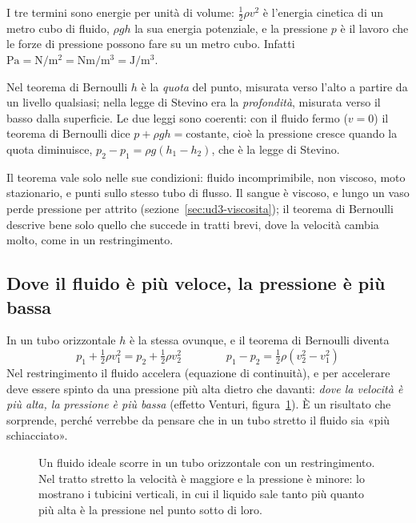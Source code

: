 I tre termini sono energie per unità di volume: $\frac{1}{2}\rho v^2$ è l'energia cinetica di un metro cubo di fluido, $\rho g h$ la sua energia potenziale, e la pressione $p$ è il lavoro che le forze di pressione possono fare su un metro cubo. Infatti $\si{\pascal} = \si{\newton\per\metre\squared} = \si{\newton\metre\per\metre\cubed} = \si{\joule\per\metre\cubed}$.

\begin{attenzione}
Nel teorema di Bernoulli $h$ è la \emph{quota} del punto, misurata verso l'alto a partire da un livello qualsiasi; nella legge di Stevino era la \emph{profondità}, misurata verso il basso dalla superficie. Le due leggi sono coerenti: con il fluido fermo ($v = 0$) il teorema di Bernoulli dice $p + \rho g h = \text{costante}$, cioè la pressione cresce quando la quota diminuisce, $p_2 - p_1 = \rho g (h_1 - h_2)$, che è la legge di Stevino.
\end{attenzione}

Il teorema vale solo nelle sue condizioni: fluido incomprimibile, non viscoso, moto stazionario, e punti sullo stesso tubo di flusso. Il sangue è viscoso, e lungo un vaso perde pressione per attrito (sezione~\ref{sec:ud3-viscosita}); il teorema di Bernoulli descrive bene solo quello che succede in tratti brevi, dove la velocità cambia molto, come in un restringimento.

\subsection{Dove il fluido è più veloce, la pressione è più bassa}

In un tubo orizzontale $h$ è la stessa ovunque, e il teorema di Bernoulli diventa
\[
  p_1 + \tfrac{1}{2}\rho v_1^2 = p_2 + \tfrac{1}{2}\rho v_2^2
  \qquad\qquad
  p_1 - p_2 = \tfrac{1}{2}\rho\left(v_2^2 - v_1^2\right)
\]
Nel restringimento il fluido accelera (equazione di continuità), e per accelerare deve essere spinto da una pressione più alta dietro che davanti: \emph{dove la velocità è più alta, la pressione è più bassa} (effetto Venturi, figura~\ref{fig:ud3-stenosi}). È un risultato che sorprende, perché verrebbe da pensare che in un tubo stretto il fluido sia «più schiacciato».

\begin{figure}[h]
\centering

\caption{Un fluido ideale scorre in un tubo orizzontale con un restringimento. Nel tratto stretto la velocità è maggiore e la pressione è minore: lo mostrano i tubicini verticali, in cui il liquido sale tanto più quanto più alta è la pressione nel punto sotto di loro.}
\label{fig:ud3-stenosi}
\end{figure}

